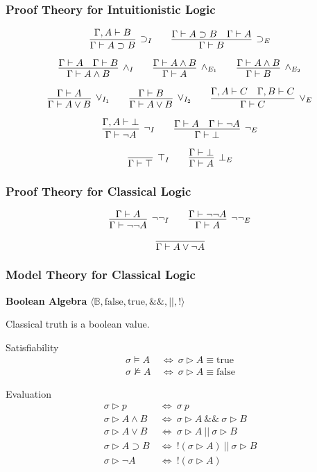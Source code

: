 \documentclass[mathserif]{beamer}
\def\true{\textrm{true}}
\def\false{\textrm{false}}
\def\imp{\supset}
\def\dfn{~\Leftrightarrow~}
\newcommand{\turn}[1]{\Gamma \vdash #1}
\newcommand{\cturn}[2]{\Gamma , #1 \vdash #2}
\newcommand{\eval}[1]{\sigma \triangleright #1}
\newcommand{\sat}[1]{\sigma \vDash #1}
\newcommand{\nsat}[1]{\sigma \nvDash #1}
\begin{document}
\begin{frame}
\frametitle{Proof Theory for Intuitionistic Logic}

$$
\infer
  [\imp_I]
  {\turn{A \imp B}}
{
  {\cturn{A}{B}}
}
\qquad
\infer
  [\imp_E]
  {\turn{B}}
{
  {\turn{A \imp B}}
  &
  {\turn{A}}
}
$$

$$
\infer
  [\land_I]
  {\turn{A \land B}}
{
  {\turn{A}}
  &
  {\turn{B}}
}
\qquad
\infer
  [\land_{E_1}]
  {\turn{A}}
{
  {\turn{A \land B}}
}
\qquad
\infer
  [\land_{E_2}]
  {\turn{B}}
{
  {\turn{A \land B}}
}
$$

$$
\infer
  [\lor_{I_1}]
  {\turn{A \lor B}}
{
  {\turn{A}}
}
\qquad
\infer
  [\lor_{I_2}]
  {\turn{A \lor B}}
{
  {\turn{B}}
}
\qquad
\infer
  [\lor_E]
  {\turn{C}}
{
  {\cturn{A}{C}}
  &
  {\cturn{B}{C}}
}
$$

$$
\infer
  [\neg_I]
  {\turn{\neg A}}
{
  {\cturn{A}{\bot}}
}
\qquad
\infer
  [\neg_E]
  {\turn{\bot}}
{
  {\turn{A}}
  &
  {\turn{\neg A}}
}
$$

$$
\infer
  [\top_I]
  {\turn{\top}}
{
}
\qquad
\infer
  [\bot_E]
  {\turn{A}}
{
  {\turn{\bot}}
}
$$

\end{frame}

\begin{frame}
\frametitle{Proof Theory for Classical Logic}


$$
\infer
  [\neg\neg_I]
  {\turn{\neg\neg A}}
{
  {\turn{A}}
}
\qquad
\infer
  [\neg\neg_E]
  {\turn{A}}
{
  {\turn{\neg\neg A}}
}
$$


$$
\infer{\turn{A \lor \neg A}}
{}
$$

\end{frame}

\begin{frame}
\frametitle{Model Theory for Classical Logic}

{\bf Boolean Algebra} $\langle \mathbb{B} , \false , \true , \&\& , || , ! \rangle$

Classical truth is a boolean value.

\begin{block}{Satisfiability}
\begin{align*}
\sat{A} &\dfn \eval{A} \equiv \true\\
\nsat{A} &\dfn \eval{A} \equiv \false
\end{align*}
\end{block}

\begin{block}{Evaluation}
\begin{align*}
\eval{p} &\dfn \sigma ~ p\\
\eval{A \land B} &\dfn \eval{A} ~\&\&~ \eval{B}\\
\eval{A \lor B} &\dfn \eval{A} ~||~ \eval{B}\\
\eval{A \imp B} &\dfn ! (\eval{A}) ~||~ \eval{B}\\
\eval{\neg A} &\dfn ! (\eval{A})
\end{align*}
\end{block}

\end{frame}
\end{document}
